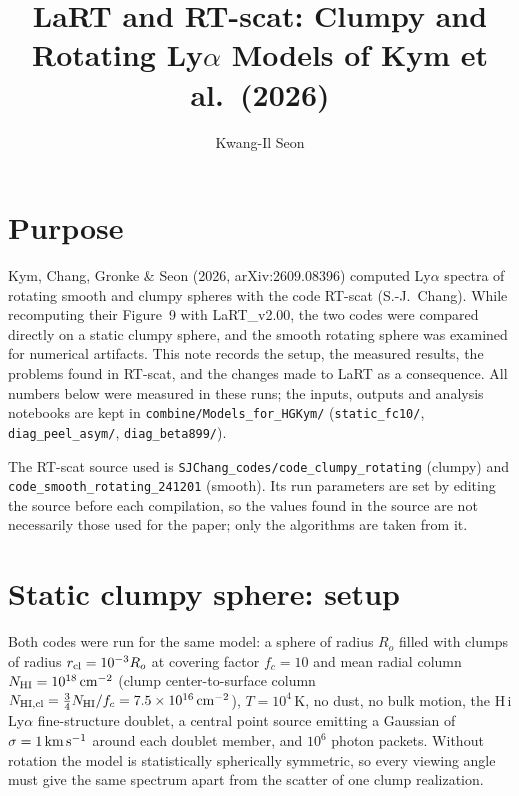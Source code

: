 \documentclass[english,a4paper]{my_memo}
\begin{document}
\title{LaRT and RT-scat: Clumpy and Rotating Ly$\alpha$ Models of Kym et al.\ (2026)}
\author{Kwang-Il Seon}
\date{\docmoddate}
\maketitle

\tableofcontents
\bigskip

\section{Purpose}

Kym, Chang, Gronke \& Seon (2026, arXiv:2609.08396) computed Ly$\alpha$ spectra of
rotating smooth and clumpy spheres with the code RT-scat (S.-J.~Chang).  While
recomputing their Figure~9 with LaRT\_v2.00, the two codes were compared directly on
a static clumpy sphere, and the smooth rotating sphere was examined for numerical
artifacts.  This note records the setup, the measured results, the problems found in
RT-scat, and the changes made to LaRT as a consequence.  All numbers below were
measured in these runs; the inputs, outputs and analysis notebooks are kept in
\texttt{combine/Models\_for\_HGKym/} (\texttt{static\_fc10/}, \texttt{diag\_peel\_asym/},
\texttt{diag\_beta899/}).

The RT-scat source used is \texttt{SJChang\_codes/code\_clumpy\_rotating} (clumpy) and
\texttt{code\_smooth\_rotating\_241201} (smooth).  Its run parameters are set by editing
the source before each compilation, so the values found in the source are not
necessarily those used for the paper; only the algorithms are taken from it.

\section{Static clumpy sphere: setup}

Both codes were run for the same model: a sphere of radius $R_o$ filled with clumps of
radius $r_{\rm cl}=10^{-3}R_o$ at covering factor $f_c=10$ and mean radial column
$N_{\rm HI}=10^{18}\,{\rm cm^{-2}}$ (clump center-to-surface column
$N_{\rm HI,cl}=\tfrac34 N_{\rm HI}/f_c=7.5\times10^{16}\,{\rm cm^{-2}}$), $T=10^4$\,K, no dust,
no bulk motion, the H\,{\sc i} Ly$\alpha$ fine-structure doublet, a central point source
emitting a Gaussian of $\sigma=1\,{\rm km\,s^{-1}}$ around each doublet member, and
$10^6$ photon packets.  Without rotation the model is statistically spherically
symmetric, so every viewing angle must give the same spectrum apart from the scatter of
one clump realization.
\end{document}
